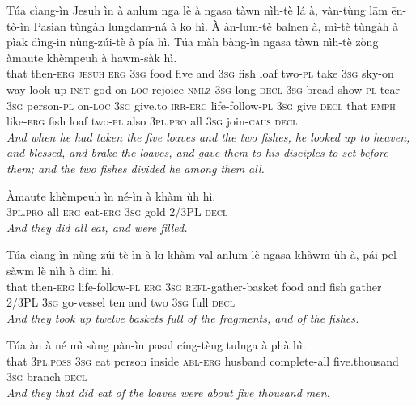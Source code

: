\documentclass[11pt,a4paper]{article}
\begin{document}
\begin{exe}
\gll Túa cìang-ìn Jesuh ìn à anlum nga lè à ngasa tàwn nìh-tè lá à, vàn-tùng lām ēn-tò-ìn Pasian tùngàh lungdam-ná à ko hì. À àn-lum-tè balnen à, mì-tè tùngàh à pìak dìng-ìn nùng-zúi-tè à pía hì. Túa màh bàng-ìn ngasa tàwn nìh-tè zòng àmaute khèmpeuh à hawm-sàk hì. \\
     that then-\textsc{erg} \textsc{jesuh} \textsc{erg} \textsc{3sg} food five and \textsc{3sg} fish loaf two-\textsc{pl} take \textsc{3sg} sky-on way look-up-\textsc{inst} god on-\textsc{loc} rejoice-\textsc{nmlz} \textsc{3sg} long \textsc{decl} \textsc{3sg} bread-show-\textsc{pl} tear \textsc{3sg} person-\textsc{pl} on-\textsc{loc} \textsc{3sg} give.to \textsc{irr}-\textsc{erg} life-follow-\textsc{pl} \textsc{3sg} give \textsc{decl} that \textsc{emph} like-\textsc{erg} fish loaf two-\textsc{pl} also \textsc{3pl}.\textsc{pro} all \textsc{3sg} join-\textsc{caus} \textsc{decl} \\
\glt \textcolor{kjvcolor}{\textit{And when he had taken the five loaves and the two fishes, he looked up to heaven, and blessed, and brake the loaves, and gave them to his disciples to set before them; and the two fishes divided he among them all.}}

\gll Àmaute khèmpeuh ìn né-ìn à khàm ùh hì. \\
     \textsc{3pl}.\textsc{pro} all \textsc{erg} eat-\textsc{erg} \textsc{3sg} gold 2/3PL \textsc{decl} \\
\glt \textcolor{kjvcolor}{\textit{And they did all eat, and were filled.}}

\gll Túa cìang-ìn nùng-zúi-tè ìn à kī-khàm-val anlum lè ngasa khàwm ùh à, pái-pel sàwm lè nìh à dim hì. \\
     that then-\textsc{erg} life-follow-\textsc{pl} \textsc{erg} \textsc{3sg} \textsc{refl}-gather-basket food and fish gather 2/3PL \textsc{3sg} go-vessel ten and two \textsc{3sg} full \textsc{decl} \\
\glt \textcolor{kjvcolor}{\textit{And they took up twelve baskets full of the fragments, and of the fishes.}}

\gll Túa àn à né mì sùng pàn-ìn pasal cíng-tèng tulnga à phà hì. \\
     that \textsc{3pl}.\textsc{poss} \textsc{3sg} eat person inside \textsc{abl}-\textsc{erg} husband complete-all five.thousand \textsc{3sg} branch \textsc{decl} \\
\glt \textcolor{kjvcolor}{\textit{And they that did eat of the loaves were about five thousand men.}}


\end{exe}
\end{document}
